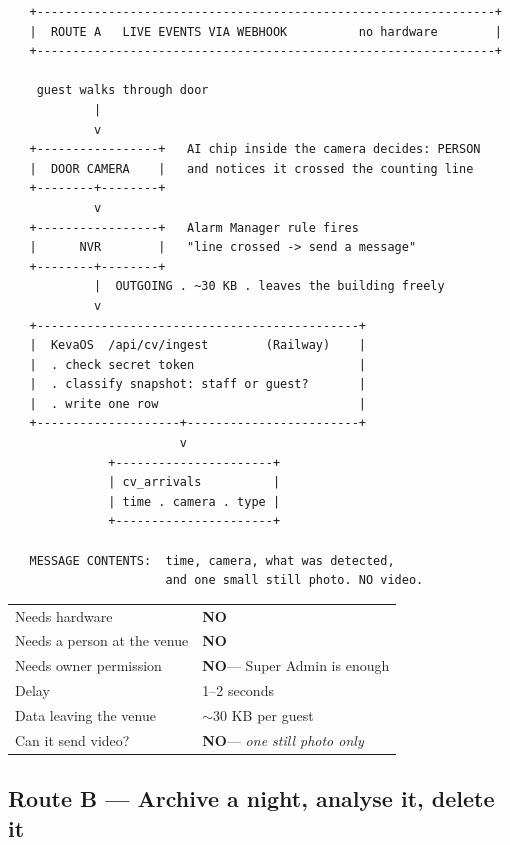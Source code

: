 \documentclass[11pt,a4paper]{article}
\newcommand{\NO}{\textcolor{bad}{\textbf{NO}}}
\begin{document}
\begin{verbatim}
   +----------------------------------------------------------------+
   |  ROUTE A   LIVE EVENTS VIA WEBHOOK          no hardware        |
   +----------------------------------------------------------------+

    guest walks through door
            |
            v
   +-----------------+   AI chip inside the camera decides: PERSON
   |  DOOR CAMERA    |   and notices it crossed the counting line
   +--------+--------+
            v
   +-----------------+   Alarm Manager rule fires
   |      NVR        |   "line crossed -> send a message"
   +--------+--------+
            |  OUTGOING . ~30 KB . leaves the building freely
            v
   +---------------------------------------------+
   |  KevaOS  /api/cv/ingest        (Railway)    |
   |  . check secret token                       |
   |  . classify snapshot: staff or guest?       |
   |  . write one row                            |
   +--------------------+------------------------+
                        v
              +----------------------+
              | cv_arrivals          |
              | time . camera . type |
              +----------------------+

   MESSAGE CONTENTS:  time, camera, what was detected,
                      and one small still photo. NO video.
\end{verbatim}

\begin{center}
\begin{tabular}{@{}ll@{}}
\toprule
Needs hardware & \NO \\
Needs a person at the venue & \NO \\
Needs owner permission & \NO --- Super Admin is enough \\
Delay & 1--2 seconds \\
Data leaving the venue & $\sim$30 KB per guest \\
Can it send video? & \NO --- \emph{one still photo only} \\
\bottomrule
\end{tabular}
\end{center}

\subsection{Route B --- Archive a night, analyse it, delete it}
\end{document}
